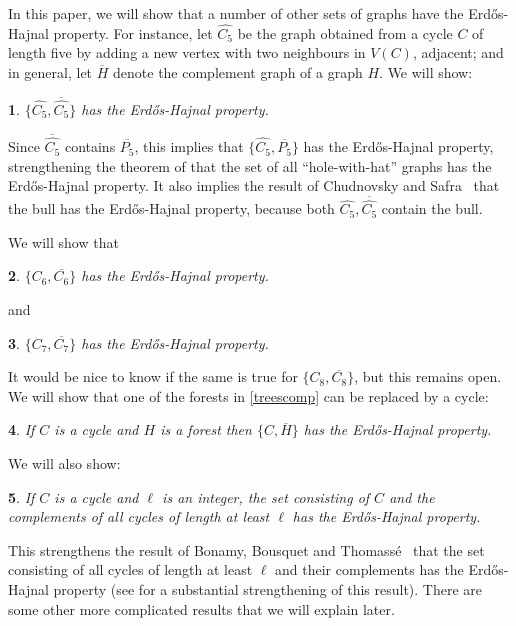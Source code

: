 \documentclass[titlepage,11pt]{article}
\newtheorem{thm}{}[section]
\begin{document}
In this paper, we will show that a number of other sets of graphs have
the Erd\H os-Hajnal property.
For instance, let $\widehat{C_5}$ be the graph 
obtained from a cycle $C$ of length five by adding a new vertex with two neighbours in $V(C)$,
adjacent; and in general, let $\overline{H}$ denote the complement graph of a graph $H$.
We will show:
\begin{thm}\label{C5hatthm}
$\{\widehat{C_5},\overline{\widehat{C_5}}\}$ has the Erd\H os-Hajnal property.
\end{thm}
Since $\overline{\widehat{C_5}}$ contains $\overline{P_5}$, this implies that $\{\widehat{C_5}, \overline{P_5}\}$
has the Erd\H os-Hajnal property, strengthening the theorem of \cite{holewithhat} that the set of all ``hole-with-hat'' graphs has the Erd\H os-Hajnal property. 
It also implies the result of Chudnovsky and Safra~\cite{safra} that the bull has the Erd\H os-Hajnal property,
because both $\widehat{C_5},\overline{\widehat{C_5}}$
contain the bull. 

We will show that 
\begin{thm}\label{C6thm}
$\{C_6, \overline{C_6}\}$ has the Erd\H os-Hajnal property.
\end{thm}
and 
\begin{thm}\label{C7thm}
$\{C_7, \overline{C_7}\}$ has the Erd\H os-Hajnal property.
\end{thm}
It would be nice to know if the same is true for $\{C_8, \overline{C_8}\}$, but this remains open.
We will show that one of the forests in \ref{treescomp} can be replaced by a cycle:
\begin{thm}\label{antiforestandhole}
If $C$ is a cycle and $H$ is a forest then $\{C,\overline{H}\}$ has the Erd\H os-Hajnal property.
\end{thm}

We will also show: 
\begin{thm}\label{antiholesandhole}
If $C$ is a cycle and $\ell$ is an integer, the set consisting of $C$ and the complements of all cycles of length at least $\ell$ has the Erd\H os-Hajnal property.
\end{thm}
This strengthens the result of Bonamy, Bousquet and Thomass\'e~\cite{bonamy} that the set consisting of all cycles of length at least $\ell$ and their complements
has the Erd\H os-Hajnal property (see \cite{pure2} for a substantial strengthening of this result).
There are some other more complicated results that we will explain later. 
\end{document}
